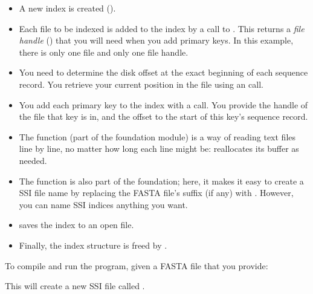 \begin{itemize}
\item A new index is created ().

\item Each file to be indexed is added to the index by a call to
      . This returns a \emph{file handle}
      () that you will need when you add primary keys. In
      this example, there is only one file and only one file handle.

\item You need to determine the disk offset at the exact beginning of
      each sequence record. You retrieve your current position in the
      file using an  call.

\item You add each primary key to the index with a
       call. You provide the handle of the
      file that key is in, and the offset to the start of this key's
      sequence record.

\item The  function (part of the  
      foundation module) is a way of reading text files line by line, 
      no matter how long each line might be: 
      reallocates its buffer as needed.

\item The  function is also part of the
       foundation; here, it makes it easy to create a
      SSI file name by replacing the FASTA file's suffix (if any) with
      . However, you can name SSI indices anything you
      want.

\item {} saves the index to an open file.

\item Finally, the index structure is freed by
      .
\end{itemize}

To compile and run the program, given a FASTA file  that
you provide:

\begin{cchunk}
\end{cchunk}

This will create a new SSI file called .



